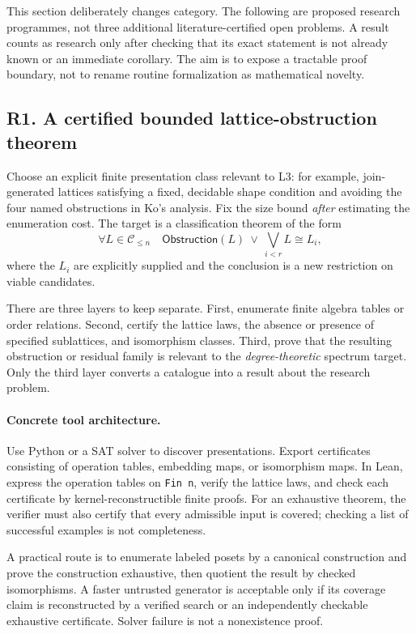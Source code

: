 \documentclass[11pt,a4paper]{article}
\theoremstyle{definition}\newtheorem{definition}[theorem]{Definition}
\theoremstyle{remark}\newtheorem{remark}[theorem]{Remark}
\begin{document}
This section deliberately changes category. The following are proposed research programmes, not three additional literature-certified open problems. A result counts as research only after checking that its exact statement is not already known or an immediate corollary. The aim is to expose a tractable proof boundary, not to rename routine formalization as mathematical novelty.

\subsection{R1. A certified bounded lattice-obstruction theorem \Pmark}
\label{entry:R1}

Choose an explicit finite presentation class relevant to L3: for example, join-generated lattices satisfying a fixed, decidable shape condition and avoiding the four named obstructions in Ko's analysis. Fix the size bound \emph{after} estimating the enumeration cost. The target is a classification theorem of the form
\[
 \forall L\in\mathcal C_{\leq n}\quad
      \mathsf{Obstruction}(L)\ \lor\
      \bigvee_{i<r}L\cong L_i,
\]
where the $L_i$ are explicitly supplied and the conclusion is a new restriction on viable candidates.

There are three layers to keep separate. First, enumerate finite algebra tables or order relations. Second, certify the lattice laws, the absence or presence of specified sublattices, and isomorphism classes. Third, prove that the resulting obstruction or residual family is relevant to the \emph{degree-theoretic} spectrum target. Only the third layer converts a catalogue into a result about the research problem.

\paragraph{Concrete tool architecture.}
Use Python or a SAT solver to discover presentations. Export certificates consisting of operation tables, embedding maps, or isomorphism maps. In Lean, express the operation tables on \texttt{Fin n}, verify the lattice laws, and check each certificate by kernel-reconstructible finite proofs. For an exhaustive theorem, the verifier must also certify that every admissible input is covered; checking a list of successful examples is not completeness.

A practical route is to enumerate labeled posets by a canonical construction and prove the construction exhaustive, then quotient the result by checked isomorphisms. A faster untrusted generator is acceptable only if its coverage claim is reconstructed by a verified search or an independently checkable exhaustive certificate. Solver failure is not a nonexistence proof.
\end{document}
